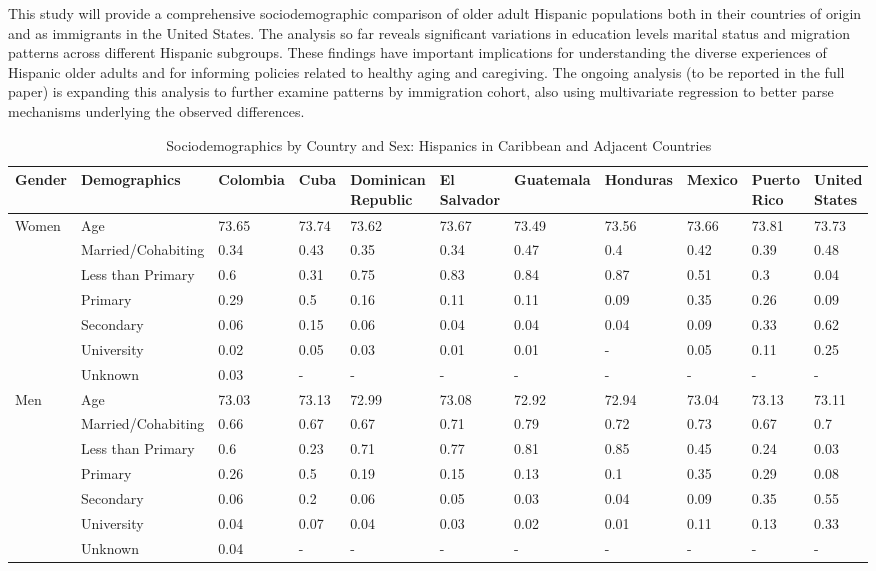 \documentclass[
]{article}
\begin{document}
This study will provide a comprehensive sociodemographic comparison of
older adult Hispanic populations both in their countries of origin and
as immigrants in the United States. The analysis so far reveals
significant variations in education levels marital status and migration
patterns across different Hispanic subgroups. These findings have
important implications for understanding the diverse experiences of
Hispanic older adults and for informing policies related to healthy
aging and caregiving. The ongoing analysis (to be reported in the full
paper) is expanding this analysis to further examine patterns by
immigration cohort, also using multivariate regression to better parse
mechanisms underlying the observed differences.

\begin{landscape}

\begin{table}[ht]
\centering
\caption{Sociodemographics by Country and Sex: Hispanics in Caribbean and Adjacent Countries}
\begingroup\small
\begin{tabular}{l|l|lllllllll}
  \hline
Gender & Demographics & Colombia & Cuba & Dominican Republic & El Salvador & Guatemala & Honduras & Mexico & Puerto Rico & United States \\ 
  \hline
Women & Age & 73.65 & 73.74 & 73.62 & 73.67 & 73.49 & 73.56 & 73.66 & 73.81 & 73.73 \\ 
   & Married/Cohabiting & 0.34 & 0.43 & 0.35 & 0.34 & 0.47 & 0.4 & 0.42 & 0.39 & 0.48 \\ 
   & Less than Primary & 0.6 & 0.31 & 0.75 & 0.83 & 0.84 & 0.87 & 0.51 & 0.3 & 0.04 \\ 
   & Primary & 0.29 & 0.5 & 0.16 & 0.11 & 0.11 & 0.09 & 0.35 & 0.26 & 0.09 \\ 
   & Secondary & 0.06 & 0.15 & 0.06 & 0.04 & 0.04 & 0.04 & 0.09 & 0.33 & 0.62 \\ 
   & University & 0.02 & 0.05 & 0.03 & 0.01 & 0.01 & - & 0.05 & 0.11 & 0.25 \\ 
   & Unknown & 0.03 & - & - & - & - & - & - & - & - \\ 
  Men & Age & 73.03 & 73.13 & 72.99 & 73.08 & 72.92 & 72.94 & 73.04 & 73.13 & 73.11 \\ 
   & Married/Cohabiting & 0.66 & 0.67 & 0.67 & 0.71 & 0.79 & 0.72 & 0.73 & 0.67 & 0.7 \\ 
   & Less than Primary & 0.6 & 0.23 & 0.71 & 0.77 & 0.81 & 0.85 & 0.45 & 0.24 & 0.03 \\ 
   & Primary & 0.26 & 0.5 & 0.19 & 0.15 & 0.13 & 0.1 & 0.35 & 0.29 & 0.08 \\ 
   & Secondary & 0.06 & 0.2 & 0.06 & 0.05 & 0.03 & 0.04 & 0.09 & 0.35 & 0.55 \\ 
   & University & 0.04 & 0.07 & 0.04 & 0.03 & 0.02 & 0.01 & 0.11 & 0.13 & 0.33 \\ 
   & Unknown & 0.04 & - & - & - & - & - & - & - & - \\ 
\hline
\end{tabular}
\endgroup
\end{table}


\end{landscape}
\end{document}
